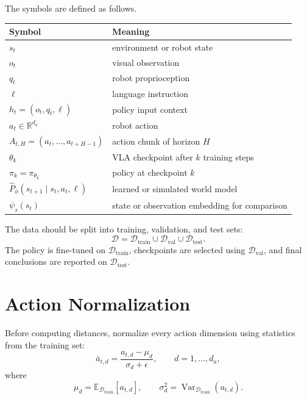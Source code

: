 \documentclass[11pt]{article}
\begin{document}
The symbols are defined as follows.

\begin{center}
\begin{tabular}{ll}
\toprule
Symbol & Meaning \\
\midrule
$s_t$ & environment or robot state \\
$o_t$ & visual observation \\
$q_t$ & robot proprioception \\
$\ell$ & language instruction \\
$h_t=(o_t,q_t,\ell)$ & policy input context \\
$a_t\in\mathbb{R}^{d_a}$ & robot action \\
$A_{t,H}=(a_t,\ldots,a_{t+H-1})$ & action chunk of horizon $H$ \\
$\theta_k$ & VLA checkpoint after $k$ training steps \\
$\pi_k=\pi_{\theta_k}$ & policy at checkpoint $k$ \\
$\widehat{P}_{\phi}(s_{t+1}\mid s_t,a_t,\ell)$ & learned or simulated world model \\
$\psi_s(s_t)$ & state or observation embedding for comparison \\
\bottomrule
\end{tabular}
\end{center}

The data should be split into training, validation, and test sets:
\begin{equation}
\mathcal{D}=\mathcal{D}_{\mathrm{train}}\cup\mathcal{D}_{\mathrm{val}}\cup\mathcal{D}_{\mathrm{test}}.
\end{equation}
The policy is fine-tuned on $\mathcal{D}_{\mathrm{train}}$, checkpoints are selected using $\mathcal{D}_{\mathrm{val}}$, and final conclusions are reported on $\mathcal{D}_{\mathrm{test}}$.

\section{Action Normalization}

Before computing distances, normalize every action dimension using statistics from the training set:
\begin{equation}
\bar{a}_{t,d} = \frac{a_{t,d}-\mu_d}{\sigma_d+\epsilon},
\qquad d=1,\ldots,d_a,
\end{equation}
where
\begin{equation}
\mu_d = \mathbb{E}_{\mathcal{D}_{\mathrm{train}}}[a_{t,d}],
\qquad
\sigma_d^2 = \operatorname{Var}_{\mathcal{D}_{\mathrm{train}}}(a_{t,d}).
\end{equation}
\end{document}
